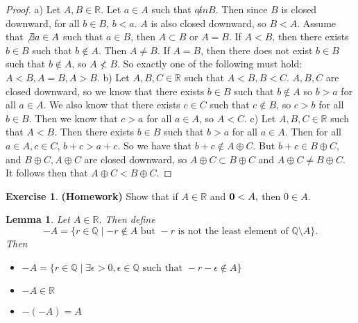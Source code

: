 \documentclass[12pt]{article}
\newcommand{\bbQ}{\mathbb{Q}}
\newcommand{\bbR}{\mathbb{R}}
\renewcommand{\_}[1]{\underline{ #1 }}
\newtheorem{lemma}[theorem]{Lemma}
\theoremstyle{definition}
\newtheorem{exercise}[theorem]{Exercise}
\numberwithin{equation}{subsection}
\begin{document}
\begin{proof}
a) Let $A,B \in \bbR$. Let $a \in A$ such that $a \not in B$. Then since $B$ is closed downward, for all $b \in B$, $b < a$. $A$ is also closed downward, so $B < A$. Assume that $\not \exists a \in A$ such that $a \in B$, then $A \subset B$ or $A = B$. If $A < B$, then there exists $b \in B$ such that $b \not \in A$. Then $A \not = B$. If $A = B$, then there does not exist $b \in B$ such that $b \not \in A$, so $A \not < B$. So exactly one of the following must hold: $A < B, A = B, A > B$. \newline
b) Let $A,B,C \in \bbR$ such that $A < B, B < C$. $A,B,C$ are closed downward, so we know that there exists $b \in B$ such that $b \not \in A$ so $b > a$ for all $a \in A$. We also know that there exists $c \in C$ such that $c \not \in B$, so $c > b$ for all $b \in B$. Then we know that $c > a$ for all $a \in A$, so $A < C$. \newline
c) Let $A,B,C \in \bbR$ such that $A < B$. Then there exists $b \in B$ such that $b > a$ for all $a \in A$. Then for all $a \in A, c \in C$, $b + c > a + c$. So we have that $b + c \not \in A \oplus C$. But $b + c \in B \oplus C$, and $B \oplus C, A \oplus C$ are closed downward, so $A \oplus C \subset B \oplus C$ and $A \oplus C \not = B \oplus C$. It follows then that $A \oplus C < B \oplus C$.
\end{proof}

\begin{exercise} {\bf (Homework)}
Show that if $A\in\bbR$ and ${\bf 0}<A,$ then $ 0\in A.$
\end{exercise}

\begin{lemma}
Let $A\in\bbR.$ Then define
$$-A=\{r\in\bbQ\mid -r\not\in A\text{ but } -r \text{ is not the least element of }\bbQ\setminus A\}.$$
Then
\begin{itemize}
\item[(a)] $-A=\{r\in\bbQ\mid\exists \epsilon>0, \epsilon\in\bbQ\text{ such that } -r-\epsilon\not\in A\}$
\item[(b)] $-A\in\bbR$
\item[(c)] $ -(-A)=A$
\end{itemize}
\end{lemma}
\end{document}
